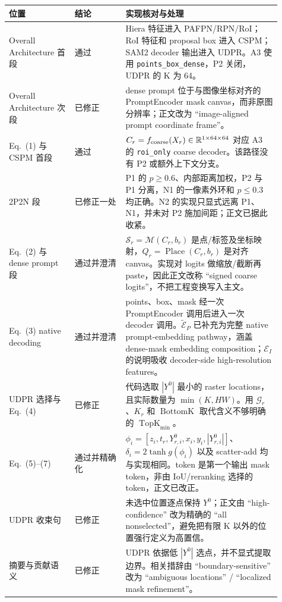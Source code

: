 \documentclass[UTF8,11pt]{ctexart}
\begin{document}
\begin{tabular}{p{0.22\linewidth}p{0.17\linewidth}p{0.52\linewidth}}
\toprule
位置 & 结论 & 实现核对与处理\\
\midrule
Overall Architecture 首段 & 通过 & Hiera 特征进入 PAFPN/RPN/RoI；RoI 特征和 proposal box 进入 CSPM；SAM2 decoder 输出进入 UDPR。A3 使用 \texttt{points\_box\_dense}，P2 关闭，UDPR 的 K 为 64。\\
Overall Architecture 次段 & 已修正 & dense prompt 位于与图像坐标对齐的 PromptEncoder mask canvas，而非原图分辨率；正文改为 ``image-aligned prompt coordinate frame''。\\
Eq.~(1) 与 CSPM 首段 & 通过 & \(C_r=f_{\rm coarse}(X_r)\in\mathbb R^{1\times64\times64}\) 对应 A3 的 \texttt{roi\_only} coarse decoder。该路径没有 P2 或额外上下文分支。\\
2P2N 段 & 已修正一处 & P1 的 \(p\geq0.6\)、内部距离加权，P2 与 P1 分离，N1 的一像素外环和 \(p\leq0.3\) 均正确。N2 的实现只显式远离 P1、N1，并未对 P2 施加间距；正文已据此收紧。\\
Eq.~(2) 与 dense prompt 段 & 通过并澄清 & \(\mathcal S_r=\mathcal M(C_r,b_r)\) 是点/标签及坐标映射，\(Q_r=\operatorname{Place}(C_r,b_r)\) 是对齐 canvas。实现对 logits 做缩放/截断再 paste，因此正文改称 ``signed coarse logits''，不把工程变换写入主文。\\
Eq.~(3) native decoding & 通过并澄清 & points、box、mask 经一次 PromptEncoder 调用后进入一次 decoder 调用。\(\widetilde{\mathcal E}_P\) 已补充为完整 native prompt-embedding pathway，涵盖 dense-mask embedding composition；\(\mathcal E_I\) 的说明吸收 decoder-side high-resolution features。\\
UDPR 选择与 Eq.~(4) & 已修正 & 代码选取 \(|Y^0|\) 最小的 raster locations，且实际数量为 \(\min(K,HW)\)。用 \(\mathcal G_r\)、\(K_r\) 和 \(\operatorname{BottomK}\) 取代含义不够明确的 \(\operatorname{TopK}_{\min}\)。\\
Eq.~(5)--(7) & 通过并精确化 & \(\phi_i=[z_i,t_r,Y^0_{r,i},x_i,y_i,|Y^0_{r,i}|]\)、\(\delta_i=2\tanh g(\phi_i)\) 以及 scatter-add 均与实现相同。token 是第一个输出 mask token，非由 IoU/reranking 选择的 token，正文已改正。\\
UDPR 收束句 & 已修正 & 未选中位置逐点保持 \(Y^0\)；正文由 ``high-confidence'' 改为精确的 ``all nonselected''，避免把有限 K 以外的位置强行定义为高置信。\\
摘要与贡献语义 & 已修正 & UDPR 依据低 \(|Y^0|\) 选点，并不显式提取边界。相关措辞由 ``boundary-sensitive'' 改为 ``ambiguous locations'' / ``localized mask refinement''。\\
\bottomrule
\end{tabular}
\end{document}
